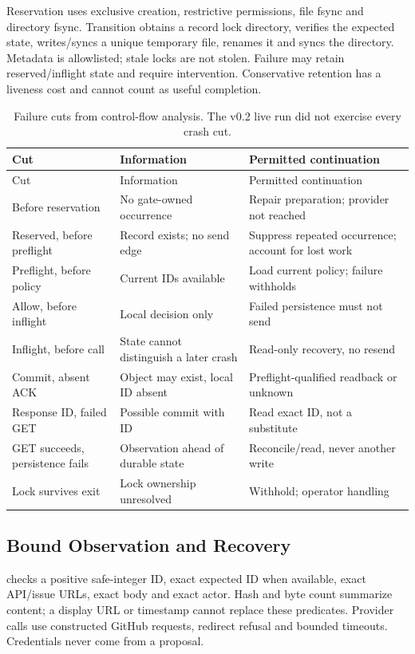 \documentclass[11pt,letterpaper]{article}
\newcommand{\code}[1]{\texttt{\detokenize{#1}}}
\begin{document}
Reservation uses exclusive creation, restrictive permissions, file fsync and
directory fsync. Transition obtains a record lock directory, verifies the
expected state, writes/syncs a unique temporary file, renames it and syncs the
directory. Metadata is allowlisted; stale locks are not stolen. Failure may
retain reserved/inflight state and require intervention. Conservative retention
has a liveness cost and cannot count as useful completion.

\begin{longtable}{@{}L{.27\linewidth}L{.31\linewidth}L{.35\linewidth}@{}}
\caption{Failure cuts from control-flow analysis. The v0.2 live run did not
exercise every crash cut.}\label{tab:cuts}\\
\toprule Cut & Information & Permitted continuation \\ \midrule
\endfirsthead
\toprule Cut & Information & Permitted continuation \\ \midrule
\endhead
Before reservation & No gate-owned occurrence & Repair preparation; provider not reached \\
Reserved, before preflight & Record exists; no send edge & Suppress repeated occurrence; account for lost work \\
Preflight, before policy & Current IDs available & Load current policy; failure withholds \\
Allow, before inflight & Local decision only & Failed persistence must not send \\
Inflight, before call & State cannot distinguish a later crash & Read-only recovery, no resend \\
Commit, absent ACK & Object may exist, local ID absent & Preflight-qualified readback or unknown \\
Response ID, failed GET & Possible commit with ID & Read exact ID, not a substitute \\
GET succeeds, persistence fails & Observation ahead of durable state & Reconcile/read, never another write \\
Lock survives exit & Lock ownership unresolved & Withhold; operator handling \\
\bottomrule
\end{longtable}

\subsection{Bound Observation and Recovery}

\code{receiptFrom} checks a positive safe-integer ID, exact expected ID when
available, exact API/issue URLs, exact body and exact actor. Hash and byte count
summarize content; a display URL or timestamp cannot replace these predicates.
Provider calls use constructed GitHub requests, redirect refusal and bounded
timeouts. Credentials never come from a proposal.
\end{document}
